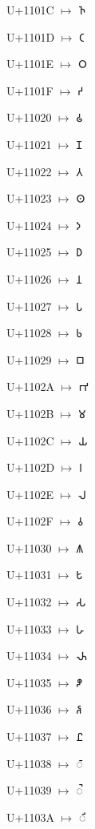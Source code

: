{\noindent U+1101C $\mapsto$ {\brfont 𑀜}\par
\noindent U+1101D $\mapsto$ {\brfont 𑀝}\par
\noindent U+1101E $\mapsto$ {\brfont 𑀞}\par
\noindent U+1101F $\mapsto$ {\brfont 𑀟}\par
\noindent U+11020 $\mapsto$ {\brfont 𑀠}\par
\noindent U+11021 $\mapsto$ {\brfont 𑀡}\par
\noindent U+11022 $\mapsto$ {\brfont 𑀢}\par
\noindent U+11023 $\mapsto$ {\brfont 𑀣}\par
\noindent U+11024 $\mapsto$ {\brfont 𑀤}\par
\noindent U+11025 $\mapsto$ {\brfont 𑀥}\par
\noindent U+11026 $\mapsto$ {\brfont 𑀦}\par
\noindent U+11027 $\mapsto$ {\brfont 𑀧}\par
\noindent U+11028 $\mapsto$ {\brfont 𑀨}\par
\noindent U+11029 $\mapsto$ {\brfont 𑀩}\par
\noindent U+1102A $\mapsto$ {\brfont 𑀪}\par
\noindent U+1102B $\mapsto$ {\brfont 𑀫}\par
\noindent U+1102C $\mapsto$ {\brfont 𑀬}\par
\noindent U+1102D $\mapsto$ {\brfont 𑀭}\par
\noindent U+1102E $\mapsto$ {\brfont 𑀮}\par
\noindent U+1102F $\mapsto$ {\brfont 𑀯}\par
\noindent U+11030 $\mapsto$ {\brfont 𑀰}\par
\noindent U+11031 $\mapsto$ {\brfont 𑀱}\par
\noindent U+11032 $\mapsto$ {\brfont 𑀲}\par
\noindent U+11033 $\mapsto$ {\brfont 𑀳}\par
\noindent U+11034 $\mapsto$ {\brfont 𑀴}\par
\noindent U+11035 $\mapsto$ {\brfont 𑀵}\par
\noindent U+11036 $\mapsto$ {\brfont 𑀶}\par
\noindent U+11037 $\mapsto$ {\brfont 𑀷}\par
\noindent U+11038 $\mapsto$ {\brfont 𑀸}\par
\noindent U+11039 $\mapsto$ {\brfont 𑀹}\par
\noindent U+1103A $\mapsto$ {\brfont 𑀺}\par
}

